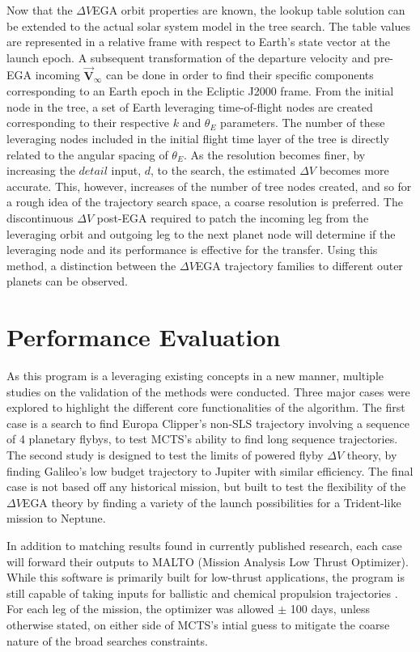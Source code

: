 \documentclass[letterpaper, preprint, paper,11pt]{AAS}	%
\begin{document}
Now that the $\Delta V$EGA orbit properties are known, the lookup table solution can be extended to the actual solar system model in the tree search. The table values are represented in a relative frame with respect to Earth's state vector at the launch epoch. A subsequent transformation of the departure velocity and pre-EGA incoming $\vec{\textbf{V}}_{\infty}$ can be done in order to find their specific components corresponding to an Earth epoch in the Ecliptic J2000 frame. From the initial node in the tree, a set of Earth leveraging time-of-flight nodes are created corresponding to their respective $k$ and $\theta_E$ parameters. The number of these leveraging nodes included in the initial flight time layer of the tree is directly related to the angular spacing of $\theta_E$. As the resolution becomes finer, by increasing the $\textit{detail}$ input, $d$, to the search, the estimated $\Delta V$ becomes more accurate. This, however, increases of the number of tree nodes created, and so for a rough idea of the trajectory search space, a coarse resolution is preferred. The discontinuous $\Delta V$ post-EGA required to patch the incoming leg from the leveraging orbit and outgoing leg to the next planet node will determine if the leveraging node and its performance is effective for the transfer. Using this method, a distinction between the $\Delta V$EGA trajectory families to different outer planets can be observed.

\section{Performance Evaluation}

As this program is a leveraging existing concepts in a new manner, multiple studies on the validation of the methods were conducted. Three major cases were explored to highlight the different core functionalities of the algorithm. The first case is a search to find Europa Clipper's non-SLS trajectory involving a sequence of 4 planetary flybys, to test MCTS's ability to find long sequence trajectories. The second study is designed to test the limits of powered flyby $\Delta V$ theory, by finding Galileo's low budget trajectory to Jupiter with similar efficiency. The final case is not based off any historical mission, but built to test the flexibility of the $\Delta V$EGA theory by finding a variety of the launch possibilities for a Trident-like mission to Neptune.

In addition to matching results found in currently published research, each case will forward their outputs to MALTO (Mission Analysis Low Thrust Optimizer). While this software is primarily built for low-thrust applications, the program is still capable of taking inputs for ballistic and chemical propulsion trajectories \cite{Sims2006}. For each leg of the mission, the optimizer was allowed $\pm$ 100 days, unless otherwise stated, on either side of MCTS's intial guess to mitigate the coarse nature of the broad searches constraints. 
\end{document}
